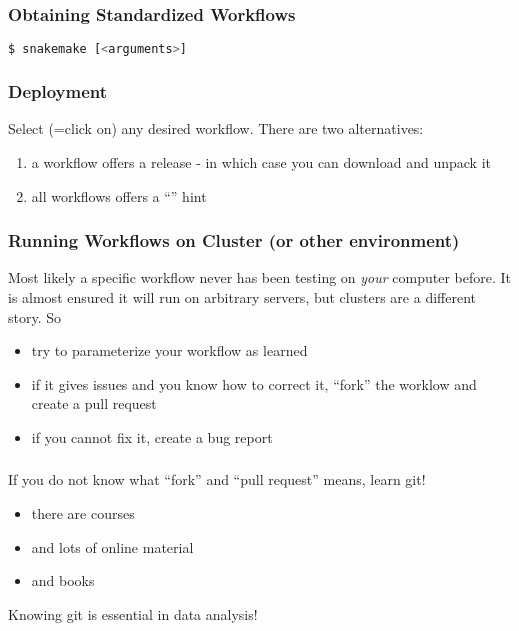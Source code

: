\begin{frame}[fragile]
  \frametitle{Obtaining Standardized Workflows}
  	\begin{lstlisting}[language=Bash, style=Shell]
$ snakemake [<arguments>]
  \end{lstlisting} 
\end{frame}

\begin{frame}[fragile]
  \frametitle{Deployment}
  Select (=click on) any desired workflow. There are two alternatives:
  \begin{enumerate}
   \item a workflow offers a release - in which case you can download and unpack it
   \item all workflows offers a ``'' hint
  \end{enumerate}
\end{frame}

\begin{frame}[fragile]
  \frametitle{Running Workflows on Cluster (or other environment)}
  Most likely a specific workflow never has been testing on \emph{your} computer before. It is almost ensured it will run on arbitrary servers, but clusters are a different story. \newline
  So
  \begin{itemize}[<+->]
   \item try to parameterize your workflow as learned
   \item if it gives issues and you know how to correct it, ``fork'' the worklow and create a pull request
   \item if you cannot fix it, create a bug report
  \end{itemize}
\end{frame}

\begin{frame}
  \frametitle{}
  If you do not know what ``fork'' and ``pull request'' means, learn git!
  \begin{itemize}[<+->]
   \item there are courses
   \item and lots of online material
   \item and books
  \end{itemize}
  \pause
  \begin{warning}
  	Knowing git is essential in data analysis!
  \end{warning}
\end{frame}


